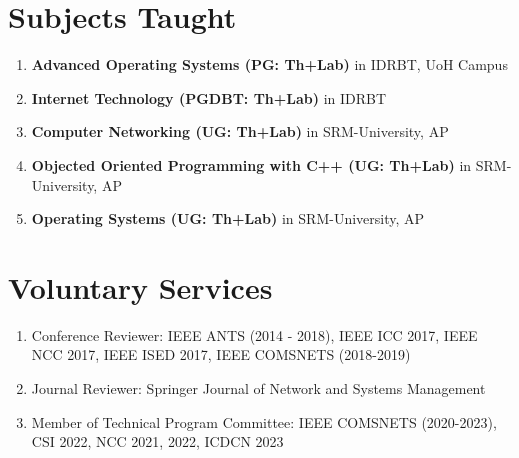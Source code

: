 \documentclass{article}
\begin{document}
\section{Subjects Taught}	
	\begin{enumerate}
	 \item {\bf Advanced Operating Systems (PG: Th+Lab)} in IDRBT, UoH Campus
	 \item {\bf Internet Technology (PGDBT: Th+Lab)} in IDRBT
	 \item {\bf Computer Networking (UG: Th+Lab)} in SRM-University, AP
	 \item {\bf Objected Oriented Programming with C++ (UG: Th+Lab)} in SRM-University, AP	 
	 \item {\bf Operating Systems (UG: Th+Lab)} in SRM-University, AP
	\end{enumerate}
\begin{comment}
\section{Teaching Assistance}	
	\begin{enumerate}
	 \item {\bf Teaching Assistant} in IIT, Guwahati For Operating Systems (CS341) (2018 Monsoon)
	 \item {\bf Teaching Assistant} in IIT, Guwahati For Network Lab (CS343) (2016 Monsoon)
	 \item {\bf Teaching Assistant} in IIT, Guwahati For Wireless Networks (CS551) (2015 Monsoon, 2017 Monsoon)
	 \item {\bf Teaching Assistant} in IIT, Guwahati For Systems Lab (CS558) (2014 Winter,2015 Winter,2016 Winter,2018 Winter)
	 \item {\bf Teaching Assistant} in IIT, Guwahati For Programming Lab (CS513) (2013 Monsoon, 2014 Monsoon)
	 \item {\bf Teaching Assistant} in IIT, Guwahati For Computing Laboratory (CS110) (2013 Winter)
	 \item {\bf Teaching Assistant} in IIT, Guwahati For Discrete Mathematics (CS202)  (2012 Monsoon)
	\end{enumerate}
\end{comment}
\section{Voluntary Services}
  \begin{enumerate}
   \item Conference Reviewer: IEEE ANTS (2014 - 2018), IEEE ICC 2017, IEEE NCC 2017, IEEE ISED 2017, IEEE COMSNETS (2018-2019)
   \item Journal Reviewer: Springer Journal of Network and Systems Management
   \item Member of Technical Program Committee: IEEE  COMSNETS (2020-2023), CSI 2022, NCC 2021, 2022, ICDCN 2023
  \end{enumerate}
\end{document}
